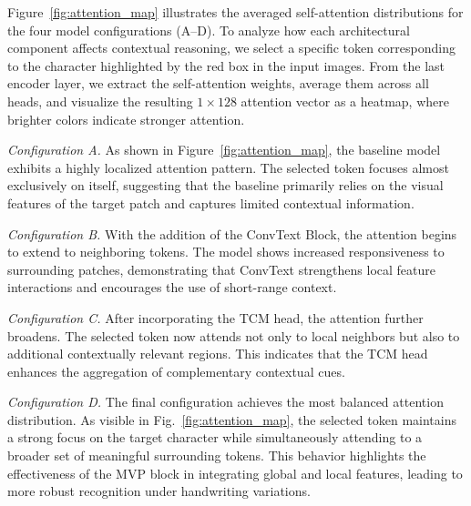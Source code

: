 \documentclass[final,5p,times]{elsarticle}
\begin{document}
Figure~\ref{fig:attention_map} illustrates the averaged self-attention distributions for the four model configurations (A--D). To analyze how each architectural component affects contextual reasoning, we select a specific token corresponding to the character highlighted by the red box in the input images. From the last encoder layer, we extract the self-attention weights, average them across all heads, and visualize the resulting $1 \times 128$ attention vector as a heatmap, where brighter colors indicate stronger attention.

\textit{Configuration A.}
As shown in Figure~\ref{fig:attention_map}, the baseline model exhibits a highly localized attention pattern. The selected token focuses almost exclusively on itself, suggesting that the baseline primarily relies on the visual features of the target patch and captures limited contextual information.

\textit{Configuration B.}
With the addition of the ConvText Block, the attention begins to extend to neighboring tokens. The model shows increased responsiveness to surrounding patches, demonstrating that ConvText strengthens local feature interactions and encourages the use of short-range context.

\textit{Configuration C.}
After incorporating the TCM head, the attention further broadens. The selected token now attends not only to local neighbors but also to additional contextually relevant regions. This indicates that the TCM head enhances the aggregation of complementary contextual cues.

\textit{Configuration D.}
The final configuration achieves the most balanced attention distribution. As visible in Fig.~\ref{fig:attention_map}, the selected token maintains a strong focus on the target character while simultaneously attending to a broader set of meaningful surrounding tokens. This behavior highlights the effectiveness of the MVP block in integrating global and local features, leading to more robust recognition under handwriting variations.

\end{document}
